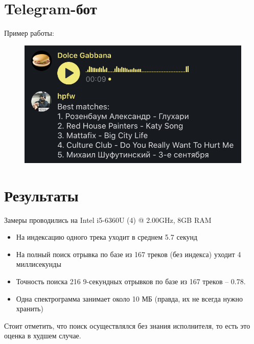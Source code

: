 \section{Telegram-бот}
Пример работы:
\begin{figure}[H]
    \centering
    \includegraphics[scale=0.6]{inc/img/tgbot.png}
    \caption{}
\end{figure}

\section{Результаты}
Замеры проводились на Intel i5-6360U (4) @ 2.00GHz, 8GB RAM
\begin{itemize}
    \item На индексацию одного трека уходит в среднем 5.7 секунд
    \item На полный поиск отрывка по базе из 167 треков (без индекса) уходит 4 миллисекунды
    \item Точность поиска 216 9-секундных отрывков по базе из 167 треков -- 0.78.
    \item Одна спектрограмма занимает около 10 МБ (правда, их не всегда нужно хранить)
\end{itemize}

Стоит отметить, что поиск осуществлялся без знания исполнителя, то есть это оценка в худшем случае.